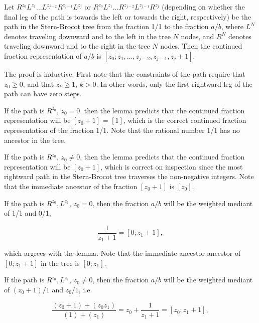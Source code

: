 \begin{vworklemmastatement}
\label{lem:ccfr0:ssbt0:sdpt1:sbtcfcorrespondence}
Let $R^{z_0}L^{z_1} \ldots{} L^{z_{j-2}} R^{z_{j-1}} L^{z_{j}}$ 
or $R^{z_0}L^{z_1} \ldots{} R^{z_{j-2}} L^{z_{j-1}} R^{z_{j}}$
(depending on whether the final leg of the path is towards the
left or towards the right, respectively) be the path in the
Stern-Brocot tree from the fraction 1/1 to the fraction $a/b$, where
$L^N$ denotes traveling downward and to the left in the tree
$N$ nodes, and $R^N$ denotes traveling downward and to the right
in the tree $N$ nodes.  Then the continued fraction representation
of $a/b$ is $[z_0; z_1, \ldots{}, z_{j-2}, z_{j-1}, z_j + 1]$.
\end{vworklemmastatement}
\begin{vworklemmaproof}
The proof is inductive.  First note that the constraints of the path
require that $z_0 \geq 0$, and that $z_k \geq 1$, $k > 0$.  In other
words, only the first rightward leg of the path can have zero steps.

If the path is $R^{z_0}$, $z_0 = 0$, then the lemma predicts that the continued fraction
representation will be $[z_0 + 1]$ = $[1]$, which is the correct continued
fraction representation of the fraction 1/1.  Note that the rational number
1/1 has no ancestor in the tree.

If the path is $R^{z_0}$, $z_0 \neq 0$, then the lemma predicts that the
continued fraction representation will be $[z_0 + 1]$, which is correct
on inspection since the most rightward path in the Stern-Brocot tree
traverses the non-negative integers.  Note that the immediate ancestor of
the fraction $[z_0 + 1]$ is $[z_0]$.

If the path is $R^{z_0}, L^{z_1}$, $z_0 = 0$, then the
fraction $a/b$ will be the weighted mediant of
1/1 and 0/1,

\begin{equation}
\label{eq:ccfr0:ssbt0:sdpt1:02}
\frac{1}{z_1 + 1}
=
[0; z_1 + 1],
\end{equation}

\noindent{}which argrees with the lemma.  Note that the 
immediate ancestor ancestor of $[0; z_1 + 1]$ in the
tree is $[0; z_1]$. 

If the path is $R^{z_0}, L^{z_1}$, $z_0 \neq 0$, then the
fraction $a/b$ will be the weighted mediant of
$(z_0 + 1)/1$ and $z_0/1$, i.e.

\begin{equation}
\label{eq:ccfr0:ssbt0:sdpt1:03}
\frac{(z_0 + 1) + (z_0 z_1)}{(1) + (z_1)}
= z_0 + \frac{1}{z_1 + 1}
= [z_0; z_1 + 1],
\end{equation}


\end{vworklemmaproof}
